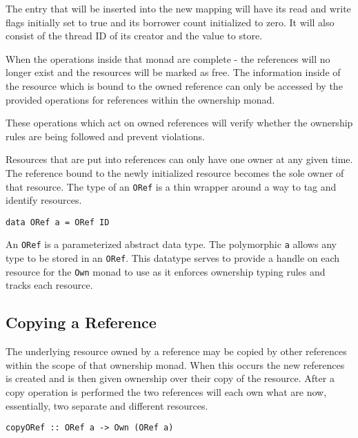 \documentclass[onehalf,11pt]{beavtex}
\begin{document}
The entry that will be inserted into the new mapping will have its read and
write flags initially set to true and its borrower count initialized to zero.
It will also consist of the thread ID of its creator and the value to store.


When the operations inside that monad are complete - the references
will no longer exist and the resources will be marked as free.
The information inside of the resource which is bound to the owned reference can
only be accessed by the provided operations for references within the ownership
monad.

These operations which act on owned references will verify whether the ownership
rules are being followed and prevent violations.

Resources that are put into references can only have one owner at any given
time. The reference bound to the newly initialized resource becomes the sole
owner of that resource. 
The type of an \texttt{ORef} is a thin wrapper around a way to tag and identify
resources.

\begin{verbatim}
data ORef a = ORef ID
\end{verbatim}

An \texttt{ORef} is a parameterized abstract data type. The polymorphic
\texttt{a} allows any type to be stored in an \texttt{ORef}.
This datatype serves to provide a handle on each resource for the \texttt{Own}
monad to use as it enforces ownership typing rules and tracks each resource.

\subsection{Copying a Reference}

The underlying resource owned by a reference may be copied by other references
within the scope of that ownership monad.  When this occurs the new references is
created and is then given ownership over their copy of the resource.  After a
copy operation is performed the two references will each own what are now,
essentially, two separate and different resources.

\begin{verbatim}
copyORef :: ORef a -> Own (ORef a)
\end{verbatim}
\end{document}
